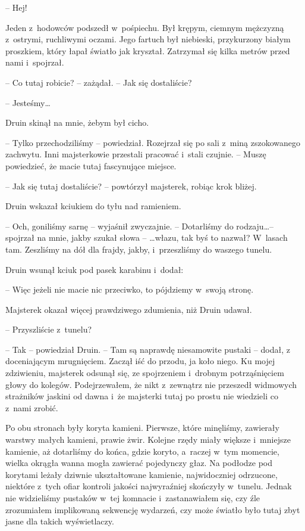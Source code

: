 \documentclass[oneside,polish,11pt,sfheadings]{mwbk}
\begin{document}
-- Hej!

Jeden z~hodowców podszedł w~pośpiechu. Był krępym, ciemnym mężczyzną z~ostrymi, ruchliwymi oczami. Jego fartuch był niebieski, przykurzony
białym proszkiem, który łapał światło jak kryształ. Zatrzymał się kilka
metrów przed nami i~spojrzał.

-- Co tutaj robicie? -- zażądał. -- Jak się dostaliście?

-- Jesteśmy\ldots

Druin skinął na mnie, żebym był cicho.

-- Tylko przechodziliśmy -- powiedział. Rozejrzał się po sali z~miną
zszokowanego zachwytu. Inni majsterkowie przestali pracować i~stali
czujnie. -- Muszę powiedzieć, że macie tutaj fascynujące miejsce.

-- Jak się tutaj dostaliście? -- powtórzył majsterek, robiąc krok bliżej.

Druin wskazał kciukiem do tyłu nad ramieniem. 

-- Och, goniliśmy sarnę -- wyjaśnił zwyczajnie. -- Dotarliśmy do rodzaju\ldots -- spojrzał na mnie,
jakby szukał słowa -- \ldots włazu, tak byś to nazwał? W~lasach tam.
Zeszliśmy na dół dla frajdy, jakby, i~przeszliśmy do waszego tunelu.

Druin wsunął kciuk pod pasek karabinu i~dodał: 

-- Więc jeżeli nie macie
nic przeciwko, to pójdziemy w~swoją stronę.

Majsterek okazał więcej prawdziwego zdumienia, niż Druin udawał.

-- Przyszliście z~tunelu?

-- Tak -- powiedział Druin. -- Tam są naprawdę niesamowite pustaki -- dodał,
z doceniającym mrugnięciem. Zaczął iść do przodu, ja koło niego. Ku
mojej zdziwieniu, majsterek odsunął się, ze spojrzeniem i~drobnym
potrząśnięciem głowy do kolegów. Podejrzewałem, że nikt z~zewnątrz nie
przeszedł widmowych strażników jaskini od dawna i~że majsterki tutaj po
prostu nie wiedzieli co z~nami zrobić.

Po obu stronach były koryta kamieni. Pierwsze, które minęliśmy,
zawierały warstwy małych kamieni, prawie żwir. Kolejne rzędy miały
większe i~mniejsze kamienie, aż dotarliśmy do końca, gdzie koryto, a~raczej w~tym momencie, wielka okrągła wanna mogła zawierać pojedynczy
głaz. Na podłodze pod korytami leżały dziwnie ukształtowane kamienie,
najwidoczniej odrzucone, niektóre z~tych ofiar kontroli jakości
najwyraźniej skończyły w~tunelu. Jednak nie widzieliśmy pustaków w~tej
komnacie i~zastanawiałem się, czy źle zrozumiałem implikowaną sekwencję
wydarzeń, czy może światło było tutaj zbyt jasne dla takich
wyświetlaczy.
\end{document}
